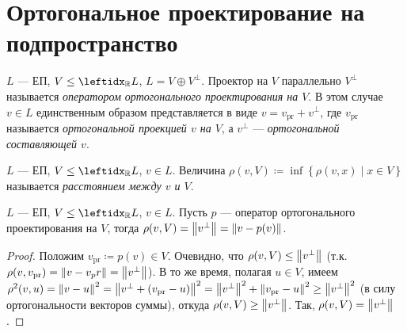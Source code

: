 \section{Ортогональное проектирование на подпространство}

\begin{defn}
    $L$ --- ЕП, $V \le \lsub{\mathbb{R}}{L}$, $L = V \oplus V^\perp$. Проектор на $V$ параллельно $V^\perp$ называется \textit{оператором ортогонального проектирования на $V$}. В этом случае $v \in L$ единственным образом представляется в виде $v = v_{\text{pr}} + v^\perp$, где $v_{\text{pr}}$ называется \textit{ортогональной проекцией $v$ на $V$}, а $v^\perp$ --- \textit{ортогональной составляющей $v$}.
\end{defn}

\begin{defn}
    $L$ --- ЕП, $V \le \lsub{\mathbb{R}}{L}$, $v \in L$. Величина $\rho(v, V) \coloneqq \inf \left\{ \rho(v, x) \mid x \in V \right\}$ называется \textit{расстоянием между $v$ и $V$}.
\end{defn}

\begin{thm}
    $L$ --- ЕП, $V \le \lsub{\mathbb{R}}{L}$, $v \in L$. Пусть $p$ --- оператор ортогонального проектирования на $V$, тогда $\rho(v, V) = \left\lVert v^\perp\right\rVert = \left\lVert v - p(v)\right\rVert$.
\end{thm}

\begin{proof}
    Положим $v_{\text{pr}} \coloneqq p(v) \in V$. Очевидно, что $\rho(v, V) \le \left\lVert v^\perp\right\rVert$ (т.к. $\rho(v, v_\text{pr}) = \left\lVert v - v_pr\right\rVert = \left\lVert v^\perp\right\rVert$). В то же время, полагая $u \in V$, имеем $\rho^2(v, u) = \left\lVert v - u\right\rVert^2 = \left\lVert v^\perp + (v_\text{pr} - u)\right\rVert^2 = \left\lVert v^\perp\right\rVert^2 + \left\lVert v_\text{pr} - u\right\rVert^2 \ge \left\lVert v^\perp\right\rVert^2$ (в силу ортогональности векторов суммы), откуда $\rho(v, V) \ge \left\lVert v^\perp\right\rVert$. Так, $\rho(v, V) = \left\lVert v^\perp\right\rVert$.
\end{proof}
